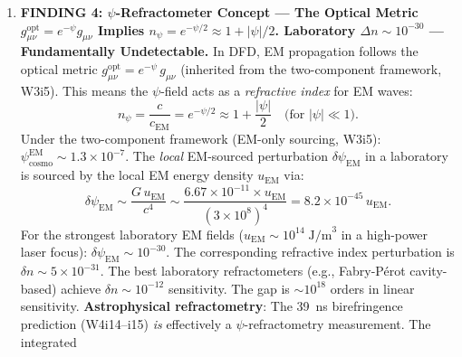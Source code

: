 \documentclass[11pt]{article}
\theoremstyle{definition}
\theoremstyle{remark}
\newcommand{\ee}[1]{\times10^{#1}}
\newcommand{\Geff}{G_{\mathrm{eff}}}
\newcommand{\honest}[1]{\textcolor{violet}{\textbf{HONEST ASSESSMENT:} #1}}
\begin{document}
\begin{tcolorbox}[colback=blue!5!white, colframe=blue!60!black,
  title=\textbf{TOP 5 FINDINGS --- W4i16 P6 (Ranked by Impact)}]
\begin{enumerate}[nosep]
  ($\sim$100~m) is in planning.  AION-10 is a technology demonstrator;
  DFD-relevant science requires AION-100 or AION-km.
  \honest{Neither MAGIS-100 nor AION can detect $\Geff$ enhancement
  in a laboratory setting.  The DFD $\Geff$ correction is a
  \emph{cosmological-scale} effect ($k \lesssim k_\mu \sim 10^{-20}\;\mathrm{m}^{-1}$).
  On sub-AU scales, $\Geff = G_N$ to extraordinary precision.
  Atom interferometers are valuable for DFD through their
  \emph{gradiometric GW detection} capability (filling the
  decihertz gap), not through direct $\Geff$ measurement.
  The inherited MAGIS-100 SNR~540 for DFD-predicted GW signals
  remains the primary science case.}

\item \textbf{FINDING 4: $\psi$-Refractometer Concept ---
  The Optical Metric $g_{\mu\nu}^{\mathrm{opt}} = e^{-\psi} g_{\mu\nu}$
  Implies $n_\psi = e^{-\psi/2} \approx 1 + |\psi|/2$.
  Laboratory $\Delta n \sim 10^{-30}$ --- Fundamentally Undetectable.}
  In DFD, EM propagation follows the optical metric
  $g_{\mu\nu}^{\mathrm{opt}} = e^{-\psi}\,g_{\mu\nu}$ (inherited
  from the two-component framework, W3i5).  This means the
  $\psi$-field acts as a \emph{refractive index} for EM waves:
  \begin{equation}
  n_\psi = \frac{c}{c_{\mathrm{EM}}} = e^{-\psi/2}
    \approx 1 + \frac{|\psi|}{2}
    \quad\text{(for $|\psi| \ll 1$)}.
  \end{equation}
  Under the two-component framework (EM-only sourcing, W3i5):
  $\psi_{\mathrm{cosmo}}^{\mathrm{EM}} \sim 1.3\ee{-7}$.
  The \emph{local} EM-sourced perturbation
  $\delta\psi_{\mathrm{EM}}$ in a laboratory is sourced by the
  local EM energy density $u_{\mathrm{EM}}$ via:
  \begin{equation}
  \delta\psi_{\mathrm{EM}} \sim \frac{G\,u_{\mathrm{EM}}}{c^4}
    \sim \frac{6.67\ee{-11} \times u_{\mathrm{EM}}}{(3\ee{8})^4}
    = 8.2\ee{-45}\,u_{\mathrm{EM}}.
  \end{equation}
  For the strongest laboratory EM fields ($u_{\mathrm{EM}} \sim 10^{14}\;\mathrm{J/m}^3$
  in a high-power laser focus): $\delta\psi_{\mathrm{EM}} \sim 10^{-30}$.
  The corresponding refractive index perturbation is
  $\delta n \sim 5\ee{-31}$.
  The best laboratory refractometers (e.g., Fabry-P\'{e}rot
  cavity-based) achieve $\delta n \sim 10^{-12}$ sensitivity.
  The gap is $\sim 10^{18}$ orders in linear sensitivity.
  \textbf{Astrophysical refractometry}: The 39~ns birefringence
  prediction (W4i14--i15) \emph{is} effectively a
  $\psi$-refractometry measurement.  The integrated

\end{enumerate}
\end{tcolorbox}
\end{document}
